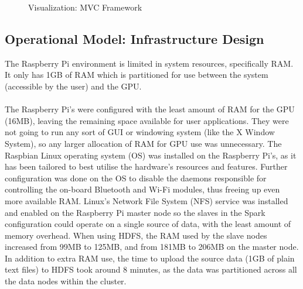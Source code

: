 \documentclass[12pt]{article} %
\begin{document}
	
		\begin{figure}[H] %
			\caption{Visualization: MVC Framework}
			\label{fig:speciation}
		\end{figure}
	
	\subsection{Operational Model: Infrastructure Design}
	
	The Raspberry Pi environment is limited in system resources, specifically RAM. It only has 1GB of RAM which is partitioned for use between the system (accessible by the user) and the GPU.\\
	\\
	The Raspberry Pi’s were configured with the least amount of RAM for the GPU (16MB), leaving the remaining space available for user applications. They were not going to run any sort of GUI or windowing system (like the X Window System), so any larger allocation of RAM for GPU use was unnecessary.
	The Raspbian Linux operating system (OS) was installed on the Raspberry Pi’s, as it has been tailored to best utilise the hardware’s resources and features. Further configuration was done on the OS to disable the daemons responsible for controlling the on-board Bluetooth and Wi-Fi modules, thus freeing up even more available RAM.
	Linux’s Network File System (NFS) service was installed and enabled on the Raspberry Pi master node so the slaves in the Spark configuration could operate on a single source of data, with the least amount of memory overhead. When using HDFS, the RAM used by the slave nodes increased from 99MB to 125MB, and from 181MB to 206MB on the master node. In addition to extra RAM use, the time to upload the source data (1GB of plain text files) to HDFS took around 8 minutes, as the data was partitioned across all the data nodes within the cluster.
	
\end{document}
